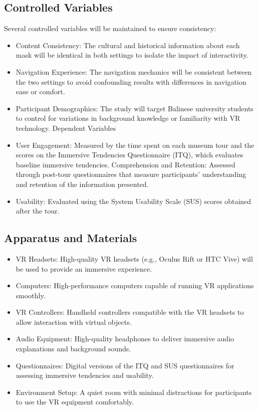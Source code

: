 \documentclass[conference]{IEEEtran}
\begin{document}
\subsection{Controlled Variables}
Several controlled variables will be maintained to ensure consistency:
\begin{itemize}
\item Content Consistency: The cultural and historical information about each mask will be identical in both settings to isolate the impact of interactivity.
\item Navigation Experience: The navigation mechanics will be consistent between the two settings to avoid confounding results with differences in navigation ease or comfort.
\item Participant Demographics: The study will target Balinese university students to control for variations in background knowledge or familiarity with VR technology.
Dependent Variables
\item User Engagement: Measured by the time spent on each museum tour and the scores on the Immersive Tendencies Questionnaire (ITQ), which evaluates baseline immersive tendencies.
Comprehension and Retention: Assessed through post-tour questionnaires that measure participants' understanding and retention of the information presented.
\item Usability: Evaluated using the System Usability Scale (SUS) scores obtained after the tour.
\end{itemize}
\subsection{Apparatus and Materials}
\begin{itemize}
\item VR Headsets: High-quality VR headsets (e.g., Oculus Rift or HTC Vive) will be used to provide an immersive experience.
\item Computers: High-performance computers capable of running VR applications smoothly.
\item VR Controllers: Handheld controllers compatible with the VR headsets to allow interaction with virtual objects.
\item Audio Equipment: High-quality headphones to deliver immersive audio explanations and background sounds.
\item Questionnaires: Digital versions of the ITQ and SUS questionnaires for assessing immersive tendencies and usability.
\item Environment Setup: A quiet room with minimal distractions for participants to use the VR equipment comfortably.
\end{itemize}
\end{document}
